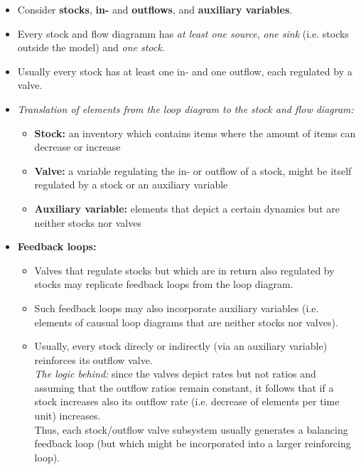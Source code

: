 \documentclass[a4paper, landscape, 6pt, fleqn]{scrartcl}
\renewcommand{\emph}[1]{\textbf{#1}}
\begin{document}
\begin{multicols*}{4}
\begin{itemize}
\item Consider \emph{stocks}, \emph{in-} and \emph{outflows}, and \emph{auxiliary variables}.
\item Every stock and flow diagramm has \textit{at least one source}, \textit{one sink} (i.e. stocks outside the model) and \textit{one stock}.
\item Usually every stock has at least one in- and one outflow, each regulated by a valve.
\item \textit{Translation of elements from the loop diagram to the stock and flow diagram:}
\begin{itemize}
\item \emph{Stock:} an inventory which contains items where the amount of items can decrease or increase
\item \emph{Valve:} a variable regulating the in- or outflow of a stock, might be itself regulated by a stock or an auxiliary variable
\item \emph{Auxiliary variable:} elements that depict a certain dynamics but are neither stocks nor valves
\end{itemize}
\item \emph{Feedback loops:}
\begin{itemize}
\item Valves that regulate stocks but which are in return also regulated by stocks may replicate feedback loops from the loop diagram.
\item Such feedback loops may also incorporate auxiliary variables (i.e. elements of causual loop diagrams that are neither stocks nor valves).
\item Usually, every stock direcly or indirectly (via an auxiliary variable) reinforces its outflow valve. \\
\textit{The logic behind:} since the valves depict rates but not ratios and assuming that the outflow ratios remain constant, it follows that if a stock increases also its outflow rate (i.e. decrease of elements per time unit) increases. \\
Thus, each stock/outflow valve subsystem usually generates a balancing feedback loop (but which might be incorporated into a larger reinforcing loop).
\end{itemize}
\end{itemize}


\end{multicols*}
\end{document}
